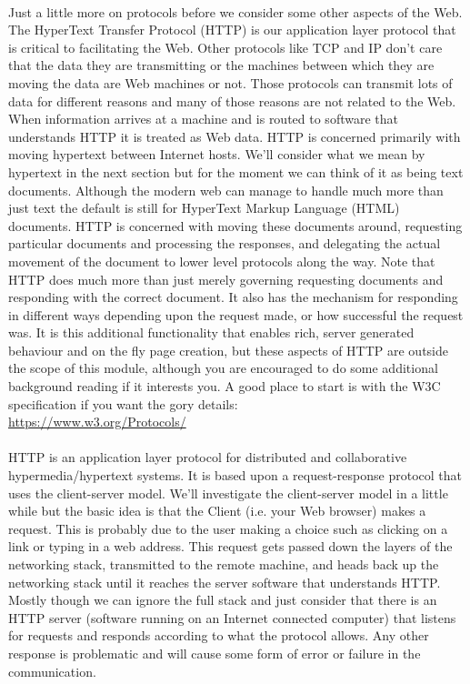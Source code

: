 \documentclass[12pt, a4paper, oneside]{book}
\begin{document}
\paragraph{} Just a little more on protocols before we consider some other aspects of the Web. The HyperText Transfer Protocol (HTTP) is our application layer protocol that is critical to facilitating the Web. Other protocols like TCP and IP don't care that the data they are transmitting or the machines between which they are moving the data are Web machines or not. Those protocols can transmit lots of data for different reasons and many of those reasons are not related to the Web.  When information arrives at a machine and is routed to software that understands HTTP it is treated as Web data. HTTP is concerned primarily with moving hypertext between Internet hosts. We'll consider what we mean by hypertext in the next section but for the moment we can think of it as being text documents. Although the modern web can manage to handle much more than just text the default is still for HyperText Markup Language (HTML) documents. HTTP is concerned with moving these documents around, requesting particular documents and processing the responses, and delegating the actual movement of the document to lower level protocols along the way. Note that HTTP does much more than just merely governing requesting documents and responding with the correct document. It also has the mechanism for responding in different ways depending upon the request made, or how successful the request was. It is this additional functionality that enables rich, server generated behaviour and on the fly page creation, but these aspects of HTTP are outside the scope of this module, although you are encouraged to do some additional background reading if it interests you. A good place to start is with the W3C specification if you want the gory details: \\
	\url{https://www.w3.org/Protocols/}
\paragraph{} HTTP is an application layer protocol for distributed and collaborative hypermedia/hypertext systems. It is based upon a request-response protocol that uses the client-server model. We'll investigate the client-server model in a little while but the basic idea is that the Client (i.e. your Web browser) makes a request. This is probably due to the user making a choice such as clicking on a link or typing in a web address. This request gets passed down the layers of the networking stack, transmitted to the remote machine, and heads back up the networking stack until it reaches the server software that understands HTTP.  Mostly though we can ignore the full stack and just consider that there is an HTTP server (software running on an Internet connected computer) that listens for requests and responds according to what the protocol allows. Any other response is problematic and will cause some form of error or failure in the communication. 
\end{document}
